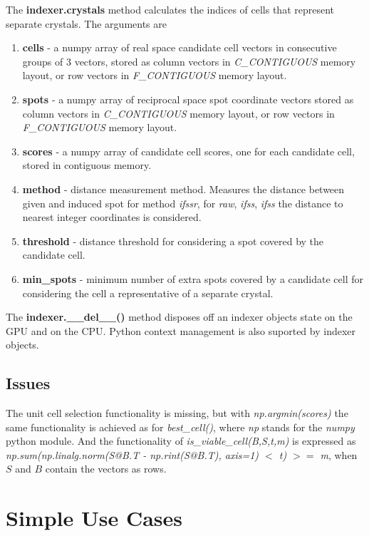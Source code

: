 \documentclass[a4paper,10pt]{article}
\begin{document}
The \textbf{indexer.crystals} method calculates the indices of cells that represent separate crystals. The arguments are
%
\begin{enumerate}
 \item \textbf{cells} - a numpy array of real space candidate cell vectors in consecutive groups of 3 vectors, stored as column vectors in \emph{C\_CONTIGUOUS} memory layout, or row vectors in \emph{F\_CONTIGUOUS} memory layout.
 \item \textbf{spots} - a numpy array of reciprocal space spot coordinate vectors stored as column vectors in \emph{C\_CONTIGUOUS} memory layout, or row vectors in \emph{F\_CONTIGUOUS} memory layout.
 \item \textbf{scores} - a numpy array of candidate cell scores, one for each candidate cell, stored in contiguous memory.
 \item \textbf{method} - distance measurement method. Measures the distance between given and induced spot for method \emph{ifssr}, for \emph{raw}, \emph{ifss}, \emph{ifss} the distance to nearest integer coordinates is considered.
 \item \textbf{threshold} - distance threshold for considering a spot covered by the candidate cell.
 \item \textbf{min\_spots} - minimum number of extra spots covered by a candidate cell for considering the cell a representative of a separate crystal.
\end{enumerate}

The \textbf{indexer.\_\_del\_\_()} method disposes off an indexer objects state on the GPU and on the CPU. Python context management is also suported by indexer objects.

\subsection{Issues}

The unit cell selection functionality is missing, but with \emph{np.argmin(scores)} the same functionality is achieved as for \emph{best\_cell()}, where \emph{np} stands for the \emph{numpy} python module. And the functionality of \emph{is\_viable\_cell(B,S,t,m)} is expressed as \emph{np.sum(np.linalg.norm(S@B.T - np.rint(S@B.T), axis=1) $<$ t) $>=$ m}, when $S$ and $B$ contain the vectors as rows.

\section{Simple Use Cases}
\end{document}
